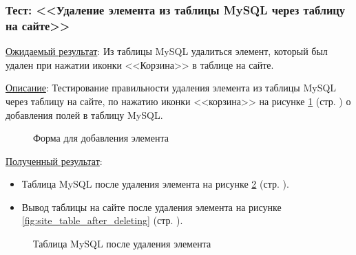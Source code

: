 \subsubsection*{\textbf{Тест}: <<Удаление элемента из таблицы MySQL через таблицу на сайте>>}

\underline{Ожидаемый результат}:
Из таблицы MySQL удалиться элемент, который был удален при нажатии иконки <<Корзина>> в таблице на сайте.

\underline{Описание}:
Тестирование правильности удаления элемента из таблицы MySQL через таблицу на сайте, по нажатию иконки <<корзина>>
на рисунке \ref{fig:test_delete_element__site_table}
(стр. \pageref{fig:test_delete_element__site_table})
о добавления полей в таблицу MySQL.

\begin{figure}[p]
    \caption{Форма для добавления элемента}
    \label{fig:test_delete_element__site_table}
\end{figure}

\underline{Полученный результат}:

\begin{itemize}
    \item Таблица MySQL после удаления элемента
    на рисунке \ref{fig:mysql_table_after_deleting}
    (стр. \pageref{fig:mysql_table_after_deleting}).

    \item Вывод таблицы на сайте после удаления элемента
    на рисунке \ref{fig:site_table_after_deleting}
    (стр. \pageref{fig:site_table_after_deleting}).
\end{itemize}

\begin{figure}[p]
    \caption{Таблица MySQL после удаления элемента}
    \label{fig:mysql_table_after_deleting}
\end{figure}

